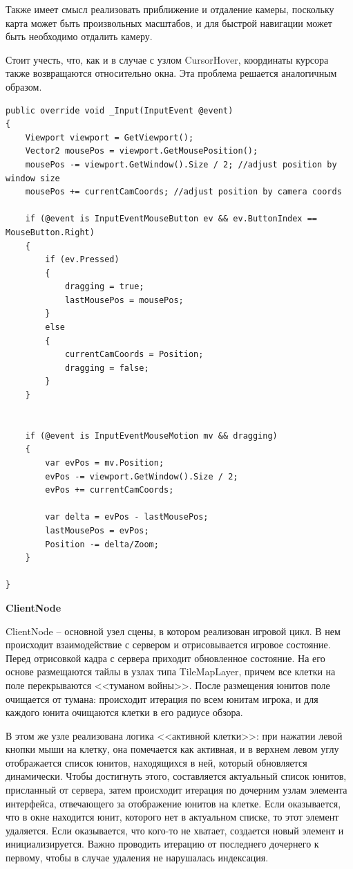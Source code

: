             Также имеет смысл реализовать приближение и отдаление камеры, поскольку карта может быть произвольных масштабов, и для быстрой навигации может быть необходимо
            отдалить камеру.

            Стоит учесть, что, как и в случае с узлом CursorHover, координаты курсора также возвращаются относительно окна. Эта проблема решается аналогичным образом.

            \begin{lstlisting}[caption=Реализация перемещения камеры]
public override void _Input(InputEvent @event)
{
    Viewport viewport = GetViewport();
    Vector2 mousePos = viewport.GetMousePosition();
    mousePos -= viewport.GetWindow().Size / 2; //adjust position by window size
    mousePos += currentCamCoords; //adjust position by camera coords

    if (@event is InputEventMouseButton ev && ev.ButtonIndex == MouseButton.Right)
    {
        if (ev.Pressed)
        {
            dragging = true;
            lastMousePos = mousePos;
        }
        else
        {
            currentCamCoords = Position;
            dragging = false;
        }
    }


    if (@event is InputEventMouseMotion mv && dragging)
    {
        var evPos = mv.Position;
        evPos -= viewport.GetWindow().Size / 2;
        evPos += currentCamCoords;

        var delta = evPos - lastMousePos;
        lastMousePos = evPos;
        Position -= delta/Zoom;
    }

}
            \end{lstlisting}

            \textbf{ClientNode}

            ClientNode -- основной узел сцены, в котором реализован игровой цикл. В нем происходит взаимодействие с сервером и отрисовывается игровое
            состояние. Перед отрисовкой кадра с сервера приходит обновленное состояние. На его основе размещаются тайлы в узлах типа TileMapLayer, причем
            все клетки на поле перекрываются <<туманом войны>>. После размещения юнитов поле очищается от тумана: происходит итерация по всем юнитам игрока,
            и для каждого юнита очищаются клетки в его радиусе обзора.
            
            В этом же узле реализована логика <<активной клетки>>: при нажатии левой кнопки мыши на клетку, она помечается как активная, и в верхнем левом углу
            отображается список юнитов, находящихся в ней, который обновляется динамически. Чтобы достигнуть этого, составляется актуальный список юнитов, 
            присланный от сервера, затем происходит итерация по дочерним узлам элемента интерфейса, отвечающего за отображение юнитов на клетке. Если 
            оказывается, что в окне находится юнит, которого нет в актуальном списке, то этот элемент удаляется. Если оказывается, что кого-то
            не хватает, создается новый элемент и инициализируется. Важно проводить итерацию от последнего дочернего к первому, чтобы в случае удаления
            не нарушалась индексация.
            
